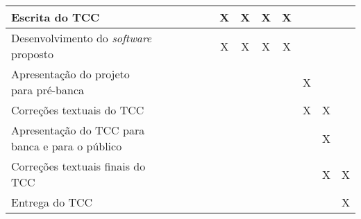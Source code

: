 \begin{table} [h]
\begin{small}
\begin{tabular}{|p{3.2in}|c|c|c|c|c|c|c|c|c|c|c|c|}
    Escrita do TCC &&&&&&X&X&X&X&&&\\\hline
    
    Desenvolvimento do \textit{software} proposto &&&&&&X&X&X&X&&&\\\hline
    
    Apresentação do projeto para pré-banca &&&&&&&&&&X&&\\\hline
    
    Correções textuais do TCC &&&&&&&&&&X&X&\\\hline
    
    Apresentação do TCC para banca e para o público &&&&&&&&&&&X&\\\hline
    
    Correções textuais finais do TCC &&&&&&&&&&&X&X\\\hline
    
    Entrega do TCC &&&&&&&&&&&&X\\\hline
  
  \end{tabular}
  
  \end{small}
  
\end{table}

\pagebreak
